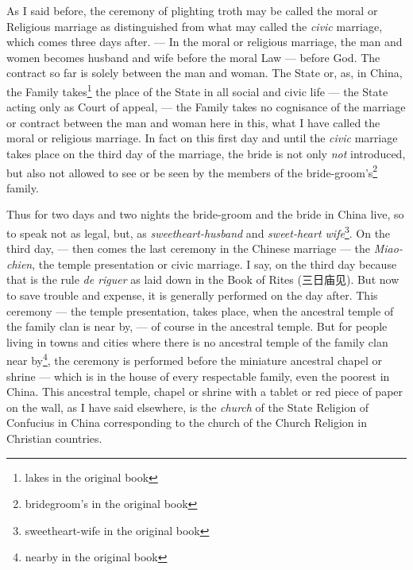 As I said before, the ceremony of plighting troth may be called the moral or Religious marriage as distinguished from what may called the \emph{civic} marriage, which comes three days after.
--- In the moral or religious marriage, the man and women becomes husband and wife before the moral Law --- before God.
The contract so far is solely between the man and woman.
The State or, as, in China, the Family takes\footnote{lakes in the original book} the place of the State in all social and civic life --- the State acting only as Court of appeal, --- the Family takes no cognisance of the marriage or contract between the man and woman here in this, what I have called the moral or religious marriage.
In fact on this first day and until the \emph{civic} marriage takes place on the third day of the marriage, the bride is not only \emph{not} introduced, but also not allowed to see or be seen by the members of the bride-groom's\footnote{bridegroom's in the original book} family. 

Thus for two days and two nights the bride-groom and the bride in China live, so to speak not as legal, but, as \emph{sweetheart-husband} and \emph{sweet-heart wife}\footnote{sweetheart-wife in the original book}.
On the third day, --- then comes the last ceremony in the Chinese marriage --- the \emph{Miao-chien}, the temple presentation or civic marriage.
I say, on the third day because that is the rule \emph{de riguer} as laid down in the Book of Rites (三日庙见).
But now to save trouble and expense, it is generally performed on the day after.
This ceremony --- the temple presentation, takes place, when the ancestral temple of the family clan is near by, --- of course in the ancestral temple.
But for people living in towns and cities where there is no ancestral temple of the family clan near by\footnote{nearby in the original book}, the ceremony is performed before the miniature ancestral chapel or shrine --- which is in the house of every respectable family, even the poorest in China.
This ancestral temple, chapel or shrine with a tablet or red piece of paper on the wall, as I have said elsewhere, is the \emph{church} of the State Religion of Confucius in China corresponding to the church of the Church Religion in Christian countries.

